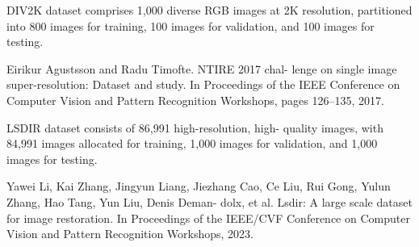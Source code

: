 DIV2K dataset comprises 1,000 diverse RGB images at
2K resolution, partitioned into 800 images for training, 100
images for validation, and 100 images for testing.

Eirikur Agustsson and Radu Timofte. NTIRE 2017 chal-
lenge on single image super-resolution: Dataset and study.
In Proceedings of the IEEE Conference on Computer Vision
and Pattern Recognition Workshops, pages 126–135, 2017.

LSDIR dataset consists of 86,991 high-resolution, high-
quality images, with 84,991 images allocated for training,
1,000 images for validation, and 1,000 images for testing.

Yawei Li, Kai Zhang, Jingyun Liang, Jiezhang Cao, Ce Liu,
Rui Gong, Yulun Zhang, Hao Tang, Yun Liu, Denis Deman-
dolx, et al. Lsdir: A large scale dataset for image restoration.
In Proceedings of the IEEE/CVF Conference on Computer
Vision and Pattern Recognition Workshops, 2023.
